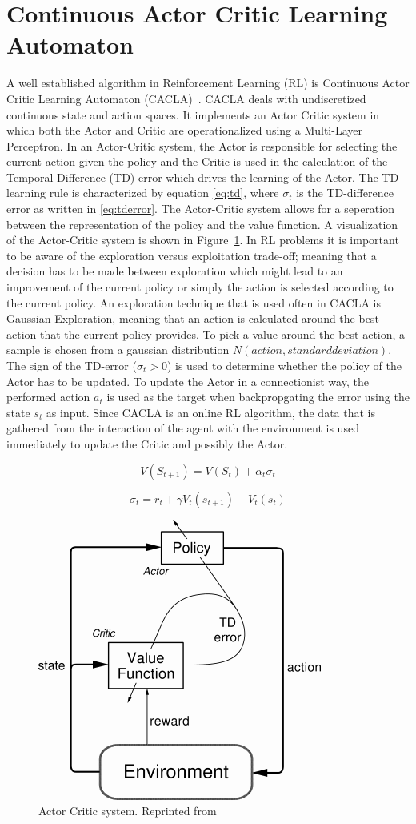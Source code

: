 
\section{Continuous Actor Critic Learning Automaton}
A well established algorithm in Reinforcement Learning (RL) is Continuous Actor Critic Learning Automaton (CACLA)~\cite{van2007reinforcement}. CACLA deals with undiscretized continuous state and action spaces. It implements an Actor Critic system in which both the Actor and Critic are operationalized using a Multi-Layer Perceptron. In an Actor-Critic system, the Actor is responsible for selecting the current action given the policy and the Critic is used in the calculation of the Temporal Difference (TD)-error which drives the learning of the Actor. The TD learning rule is characterized by equation \eqref{eq:td}, where $\sigma_{t}$ is the TD-difference error as written in \eqref{eq:tderror}. The Actor-Critic system allows for a seperation between the representation of the policy and the value function. A visualization of the Actor-Critic system is shown in Figure~\ref{fig:actorcriticsystem}. In RL problems it is important to be aware of the exploration versus exploitation trade-off; meaning that a decision has to be made between exploration which might lead to an improvement of the current policy or simply the action is selected according to the current policy. An exploration technique that is used often in CACLA is Gaussian Exploration, meaning that an action is calculated around the best action that the current policy provides. To pick a value around the best action, a sample is chosen from a gaussian distribution $N(action, standard deviation)$. The sign of the TD-error ($\sigma_{t} > 0$) is used to determine whether the policy of the Actor has to be updated. To update the Actor in a connectionist way, the performed action $a_{t}$ is used as the target when backpropgating the error using the state $s_{t}$ as input. Since CACLA is an online RL algorithm, the data that is gathered from the interaction of the agent with the environment is used immediately to update the Critic and possibly the Actor. 

\begin{equation}
\label{eq:td}
V(S_{t+1}) = V(S_t) + \alpha_{t} \sigma_{t}
\end{equation}

\begin{equation}
\label{eq:tderror}
\sigma_{t} = r_{t} + \gamma V_{t}(s_{t+1}) - V_{t}(s_{t})
\end{equation}

\begin{figure}[t]
 \centering 
    \includegraphics[width = 0.35\columnwidth]{figs/actorcritic.png}
 \caption{Actor Critic system. Reprinted from~\cite{sutton1998reinforcement}}
\label{fig:actorcriticsystem}
\end{figure}



